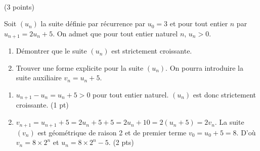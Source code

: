 \documentclass[a4paper,11pt]{article}
\theoremstyle{break}
\begin{document}
     ~
  \vspace{0.5cm}
 

\begin{exo}(3 points)

Soit $(u_n)$ la suite définie par récurrence par $u_0=3$ et pour tout entier $n$ par 
$u_{n+1}=2 u_n +5$. On admet que pour tout entier naturel $n$, $u_n>0$.

\begin{enumerate}
  \item Démontrer que le suite $(u_n)$ est strictement croissante.
  \item Trouver une forme explicite pour la suite $(u_n)$. On pourra introduire la suite auxiliaire
  $v_n=u_n+5$.
\end{enumerate}

\begin{correction}
\begin{enumerate}
 \item $u_{n+1}-u_n=u_n+5>0$ pour tout entier naturel. $(u_n)$ est donc strictement croissante. (1 pt)
 \item $v_{n+1}=u_{n+1}+5=2 u_n+5+5=2 u_n +10=2(u_n+5)=2 v_n$. La suite $(v_n)$ est g\'eom\'etrique
  de raison 2 et de premier terme $v_0=u_0+5=8$. D'o\`u $v_n=8 \times 2^n$ et $u_n=8 \times 2^n-5$. (2 pts)
\end{enumerate}


\end{correction}

\begin{correction}

\end{correction}


\end{exo}
\end{document}
